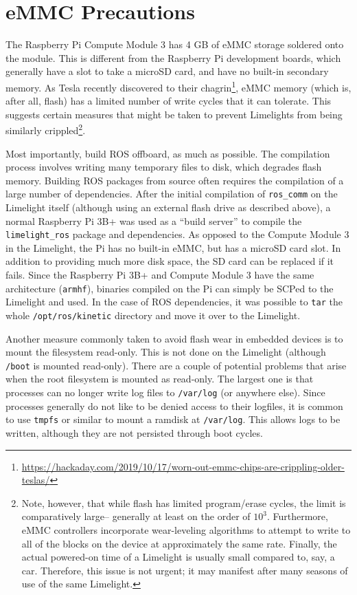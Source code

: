 \documentclass{article}
\begin{document}
\section{eMMC Precautions}
\label{sec:emmc}
\par The Raspberry Pi Compute Module 3 has 4 GB of eMMC storage soldered onto the module. This is different from the Raspberry Pi development boards, which generally have a slot to take a microSD card, and have no built-in secondary memory. As Tesla recently discovered to their chagrin\footnote{\url{https://hackaday.com/2019/10/17/worn-out-emmc-chips-are-crippling-older-teslas/}}, eMMC memory (which is, after all, flash) has a limited number of write cycles that it can tolerate. This suggests certain measures that might be taken to prevent Limelights from being similarly crippled\footnote{Note, however, that while flash has limited program/erase cycles, the limit is comparatively large-- generally at least on the order of $10^3$. Furthermore, eMMC controllers incorporate wear-leveling algorithms to attempt to write to all of the blocks on the device at approximately the same rate. Finally, the actual powered-on time of a Limelight is usually small compared to, say, a car. Therefore, this issue is not urgent; it may manifest after many seasons of use of the same Limelight.}.
\par Most importantly, build ROS offboard, as much as possible. The compilation process involves writing many temporary files to disk, which degrades flash memory. Building ROS packages from source often requires the compilation of a large number of dependencies. After the initial compilation of \texttt{ros\_comm} on the Limelight itself (although using an external flash drive as described above), a normal Raspberry Pi 3B+ was used as a ``build server'' to compile the \texttt{limelight\_ros} package and dependencies. As opposed to the Compute Module 3 in the Limelight, the Pi has no built-in eMMC, but has a microSD card slot. In addition to providing much more disk space, the SD card can be replaced if it fails. Since the Raspberry Pi 3B+ and Compute Module 3 have the same architecture (\texttt{armhf}), binaries compiled on the Pi can simply be SCPed to the Limelight and used. In the case of ROS dependencies, it was possible to \texttt{tar} the whole \texttt{/opt/ros/kinetic} directory and move it over to the Limelight. 
\par Another measure commonly taken to avoid flash wear in embedded devices is to mount the filesystem read-only. This is not done on the Limelight (although \texttt{/boot} is mounted read-only). There are a couple of potential problems that arise when the root filesystem is mounted as read-only. The largest one is that processes can no longer write log files to \texttt{/var/log} (or anywhere else). Since processes generally do not like to be denied access to their logfiles, it is common to use \texttt{tmpfs} or similar to mount a ramdisk at \texttt{/var/log}. This allows logs to be written, although they are not persisted through boot cycles. 
\end{document}
